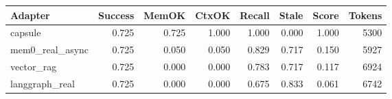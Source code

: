 \begin{tabular}{lrrrrrrr}
\hline
Adapter & Success & MemOK & CtxOK & Recall & Stale & Score & Tokens \\
\hline
capsule & 0.725 & 0.725 & 1.000 & 1.000 & 0.000 & 1.000 & 5300 \\
mem0\_real\_async & 0.725 & 0.050 & 0.050 & 0.829 & 0.717 & 0.150 & 5927 \\
vector\_rag & 0.725 & 0.000 & 0.000 & 0.783 & 0.717 & 0.117 & 6924 \\
langgraph\_real & 0.725 & 0.000 & 0.000 & 0.675 & 0.833 & 0.061 & 6742 \\
\hline
\end{tabular}
